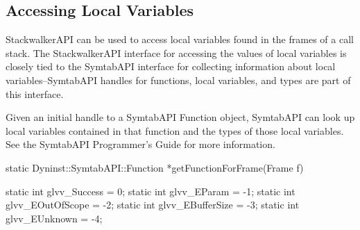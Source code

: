 \subsection{Accessing Local Variables}
	
StackwalkerAPI can be used to access local variables found in the frames of a
call stack. The StackwalkerAPI interface for accessing the values of local
variables is closely tied to the SymtabAPI interface for collecting information
about local variables--SymtabAPI handles for functions, local variables, and
types are part of this interface. 

Given an initial handle to a SymtabAPI Function object, SymtabAPI can look up
local variables contained in that function and the types of those local
variables. See the SymtabAPI Programmer's Guide for more information.

\begin{apient}
static Dyninst::SymtabAPI::Function *getFunctionForFrame(Frame f)
\end{apient}

\begin{apient}
static int glvv_Success = 0;
static int glvv_EParam = -1;
static int glvv_EOutOfScope = -2;
static int glvv_EBufferSize = -3;
static int glvv_EUnknown = -4;
\end{apient}

